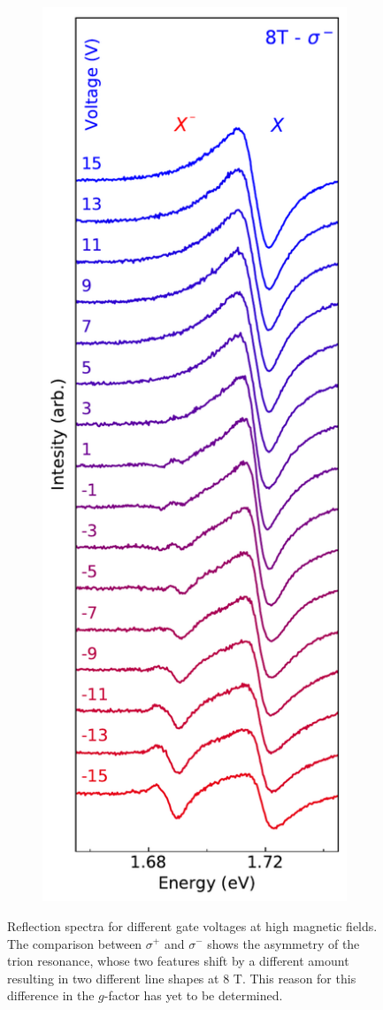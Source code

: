 \begin{figure}[t]
\begin{subfigure}{0.32\textwidth}
	\end{subfigure}
	\begin{subfigure}{0.32\textwidth}
		\caption{}
		\includegraphics[width=\textwidth]{waterfall_8TRF_sm}
	\end{subfigure}
	\caption{Reflection spectra for different gate voltages at high magnetic fields. The comparison between $\sigma^+$ and $\sigma^-$ shows the asymmetry of the trion resonance, whose two features shift by a different amount resulting in two different line shapes at 8 T. This reason for this difference in the $g$-factor has yet to be determined.}\label{waterfallRF}
\end{figure}

